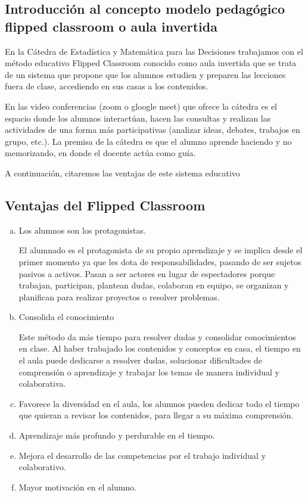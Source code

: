 \documentclass[oneside,spanish]{amsart}
\numberwithin{equation}{section}
\numberwithin{figure}{section}
\theoremstyle{definition}
\begin{document}
\subsection{Introducción al concepto modelo pedagógico flipped classroom o aula invertida}

En la Cátedra de Estadística y Matemática para las Decisiones trabajamos con el método educativo Flipped Classroom conocido como aula invertida que se trata de un sistema que propone que los alumnos estudien y preparen las lecciones fuera de clase, accediendo en sus casas a los contenidos.

En las video conferencias (zoom o gloogle meet) que ofrece la cátedra es el espacio donde los alumnos interactúan, hacen las consultas y realizan las actividades de una forma más participativas (analizar ideas, debates, trabajos en grupo, etc.). La premisa de la cátedra es que el alumno aprende haciendo y no memorizando, en donde el docente actúa como guía.

A continuación, citaremos las ventajas de este sistema educativo

\subsection{Ventajas del Flipped Classroom}

\begin{enumerate}[a.-]
	\item Los alumnos son los protagonistas.
	
	El alumnado es el protagonista de su propio aprendizaje y se implica desde el primer momento ya que les dota de responsabilidades, pasando de ser sujetos pasivos a activos. Pasan a ser actores en lugar de espectadores porque trabajan, participan, plantean dudas, colaboran en equipo, se organizan y planifican para realizar proyectos o resolver problemas.
	
	\item Consolida el conocimiento
	
	Este método da más tiempo para resolver dudas y consolidar conocimientos en clase. Al haber trabajado los contenidos y conceptos en casa, el tiempo en el aula puede dedicarse a resolver dudas, solucionar dificultades de comprensión o aprendizaje y trabajar los temas de manera individual y colaborativa.
	
	\item Favorece la diversidad en el aula, los alumnos pueden dedicar todo el tiempo que quieran a revisar los contenidos, para llegar a su máxima comprensión. 
	
	\item Aprendizaje más profundo y perdurable en el tiempo.
	
	\item Mejora el desarrollo de las competencias por el trabajo individual y colaborativo.
	
	\item Mayor motivación en el alumno.
\end{enumerate}
\end{document}
